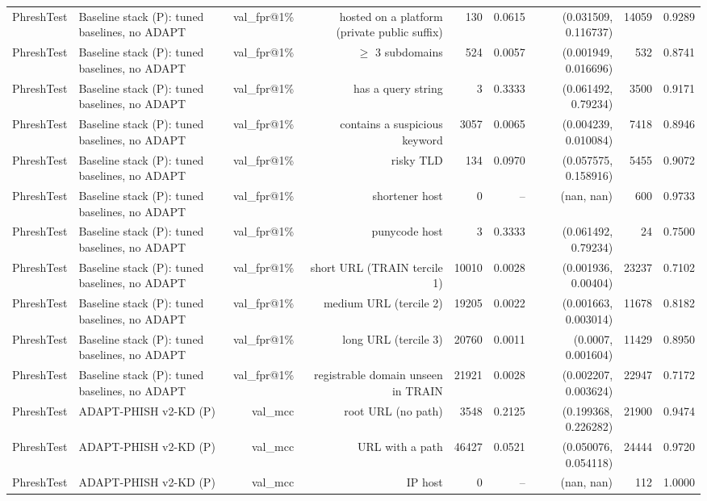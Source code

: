 \begin{table}[t]
\begin{tabular}{llrrrrrrr}
PhreshTest & Baseline stack (P): tuned baselines, no ADAPT & val\_fpr@1\% & hosted on a platform (private public suffix) & 130 & 0.0615 & (0.031509, 0.116737) & 14059 & 0.9289 \\
PhreshTest & Baseline stack (P): tuned baselines, no ADAPT & val\_fpr@1\% & $\geq$ 3 subdomains & 524 & 0.0057 & (0.001949, 0.016696) & 532 & 0.8741 \\
PhreshTest & Baseline stack (P): tuned baselines, no ADAPT & val\_fpr@1\% & has a query string & 3 & 0.3333 & (0.061492, 0.79234) & 3500 & 0.9171 \\
PhreshTest & Baseline stack (P): tuned baselines, no ADAPT & val\_fpr@1\% & contains a suspicious keyword & 3057 & 0.0065 & (0.004239, 0.010084) & 7418 & 0.8946 \\
PhreshTest & Baseline stack (P): tuned baselines, no ADAPT & val\_fpr@1\% & risky TLD & 134 & 0.0970 & (0.057575, 0.158916) & 5455 & 0.9072 \\
PhreshTest & Baseline stack (P): tuned baselines, no ADAPT & val\_fpr@1\% & shortener host & 0 & -- & (nan, nan) & 600 & 0.9733 \\
PhreshTest & Baseline stack (P): tuned baselines, no ADAPT & val\_fpr@1\% & punycode host & 3 & 0.3333 & (0.061492, 0.79234) & 24 & 0.7500 \\
PhreshTest & Baseline stack (P): tuned baselines, no ADAPT & val\_fpr@1\% & short URL (TRAIN tercile 1) & 10010 & 0.0028 & (0.001936, 0.00404) & 23237 & 0.7102 \\
PhreshTest & Baseline stack (P): tuned baselines, no ADAPT & val\_fpr@1\% & medium URL (tercile 2) & 19205 & 0.0022 & (0.001663, 0.003014) & 11678 & 0.8182 \\
PhreshTest & Baseline stack (P): tuned baselines, no ADAPT & val\_fpr@1\% & long URL (tercile 3) & 20760 & 0.0011 & (0.0007, 0.001604) & 11429 & 0.8950 \\
PhreshTest & Baseline stack (P): tuned baselines, no ADAPT & val\_fpr@1\% & registrable domain unseen in TRAIN & 21921 & 0.0028 & (0.002207, 0.003624) & 22947 & 0.7172 \\
PhreshTest & ADAPT-PHISH v2-KD (P) & val\_mcc & root URL (no path) & 3548 & 0.2125 & (0.199368, 0.226282) & 21900 & 0.9474 \\
PhreshTest & ADAPT-PHISH v2-KD (P) & val\_mcc & URL with a path & 46427 & 0.0521 & (0.050076, 0.054118) & 24444 & 0.9720 \\
PhreshTest & ADAPT-PHISH v2-KD (P) & val\_mcc & IP host & 0 & -- & (nan, nan) & 112 & 1.0000 \\

\end{tabular}
\end{table}
